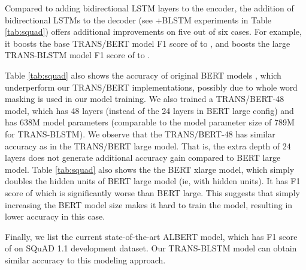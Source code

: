 \documentclass[11pt,a4paper]{article}
\begin{document}
Compared to adding bidirectional LSTM layers to the encoder, the addition of bidirectional LSTMs to the decoder (see +BLSTM experiments in Table \ref{tab:squad}) offers additional improvements on five out of six cases. For example, it boosts the base TRANS/BERT model F1 score of  to , and boosts the large TRANS-BLSTM model F1 score of  to . 

Table \ref{tab:squad} also shows the accuracy of original BERT models \cite{devlin2018}, which underperform our TRANS/BERT implementations, possibly due to whole word masking is used in our model training.  We also trained a TRANS/BERT-48 model, which has 48 layers (instead of the 24 layers in BERT large config) and has 638M model parameters (comparable to the model parameter size of 789M for TRANS-BLSTM). We observe that the TRANS/BERT-48 has similar accuracy as in the TRANS/BERT large model. That is, the extra depth of 24 layers does not generate additional accuracy gain compared to BERT large model. Table   
\ref{tab:squad}  also shows the the BERT xlarge model, which simply doubles the hidden units of BERT large model (ie, with  hidden units). It has F1 score of  which is significantly worse than BERT large. This suggests that simply increasing the BERT model size makes it hard to train the model, resulting in lower accuracy in this case.

Finally, we list the current state-of-the-art ALBERT model, which has F1 score of  on SQuAD 1.1 development dataset. Our TRANS-BLSTM model can obtain similar accuracy to this modeling approach. 
\end{document}
